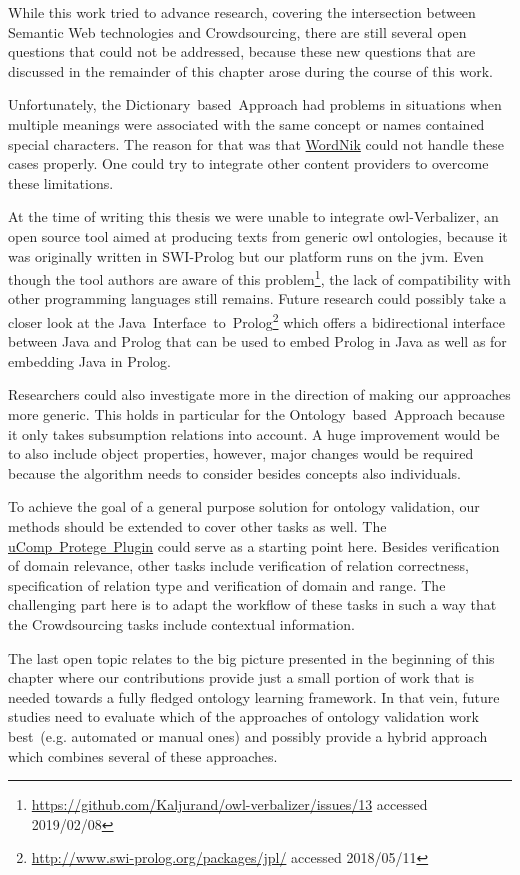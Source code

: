 While this work tried to advance research, covering the intersection between Semantic Web technologies and Crowdsourcing, there are still several open questions that could not be addressed, because these new questions that are discussed in the remainder of this chapter arose during the course of this work.

Unfortunately, the Dictionary~based~Approach had problems in situations when multiple meanings were associated with the same concept or names contained special characters. The reason for that was that \hyperref[sec:wordnik]{WordNik} could not handle these cases properly. One could try to integrate other content providers to overcome these limitations. 

At the time of writing this thesis we were unable to integrate \gls{owl}-Verbalizer, an open source tool aimed at producing texts from generic \gls{owl} ontologies, because it was originally written in SWI-Prolog but our platform runs on the \gls{jvm}. Even though the tool authors are aware of this problem\footnote{\url{https://github.com/Kaljurand/owl-verbalizer/issues/13} accessed 2019/02/08}, the lack of compatibility with other programming languages still remains. Future research could possibly take a closer look at the Java~Interface~to~Prolog\footnote{\url{http://www.swi-prolog.org/packages/jpl/} accessed 2018/05/11} which offers a bidirectional interface between Java and Prolog that can be used to embed Prolog in Java as well as for embedding Java in Prolog. 

Researchers could also investigate more in the direction of making our approaches more generic. This holds in particular for the Ontology~based~Approach because it only takes subsumption relations into account. A huge improvement would be to also include object properties, however, major changes would be required because the algorithm needs to consider besides concepts also individuals. 

To achieve the goal of a general purpose solution for ontology validation, our methods should be extended to cover other tasks as well.
The \hyperref[sec:ucomp_protege_plugin]{uComp~Protege~Plugin} could serve as a starting point here. Besides verification of domain relevance, other tasks include verification of relation correctness, specification of relation type and verification of domain and range. The challenging part here is to adapt the workflow of these tasks in such a way that the Crowdsourcing tasks include contextual information. 

The last open topic relates to the big picture presented in the beginning of this chapter where our contributions provide just a small portion of work that is needed towards a fully fledged ontology learning framework. In that vein, future studies need to evaluate which of the approaches of ontology validation work best~(e.g. automated or manual ones) and possibly provide a hybrid approach which combines several of these approaches.



